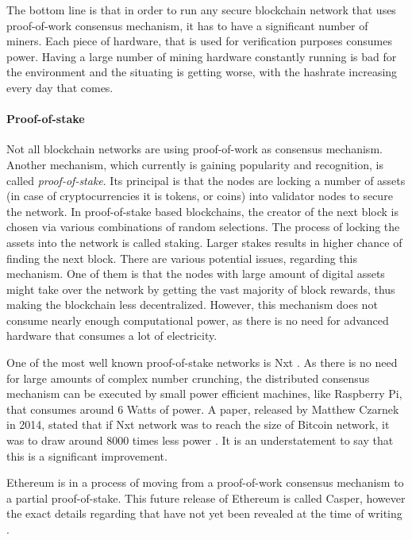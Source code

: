 The bottom line is that in order to run any secure blockchain network that uses proof-of-work consensus mechanism, it has to have a significant number of miners. Each piece of hardware, that is used for verification purposes consumes power. Having a large number of mining hardware constantly running is bad for the environment and the situating is getting worse, with the hashrate increasing every day that comes.

\paragraph{Proof-of-stake}
Not all blockchain networks are using proof-of-work as consensus mechanism. Another mechanism, which currently is gaining popularity and recognition, is called \emph{\gls{proof-of-stake}}. Its principal is that the nodes are locking a number of assets (in case of cryptocurrencies it is tokens, or coins) into validator nodes to secure the network. In proof-of-stake based blockchains, the creator of the next block is chosen via various combinations of random selections. The process of locking the assets into the network is called staking. Larger stakes results in higher chance of finding the next block. There are various potential issues, regarding this mechanism. One of them is that the nodes with large amount of digital assets might take over the network by getting the vast majority of block rewards, thus making the blockchain less decentralized. However, this mechanism does not consume nearly enough computational power, as there is no need for advanced hardware that consumes a lot of electricity. 

One of the most well known proof-of-stake networks is Nxt \citep{nxtwhitepaper}. As there is no need for large amounts of complex number crunching, the distributed consensus mechanism can be executed by small power efficient machines, like Raspberry Pi, that consumes around 6 Watts of power. A paper, released by Matthew Czarnek in 2014, stated that if Nxt network was to reach the size of Bitcoin network, it was to draw around 8000 times less power \citep{nxtpos}. It is an understatement to say that this is a significant improvement.

Ethereum is in a process of moving from a proof-of-work consensus mechanism to a partial proof-of-stake. This future release of Ethereum is called Casper, however the exact details regarding that have not yet been revealed at the time of writing \citep{ethpos}. 

